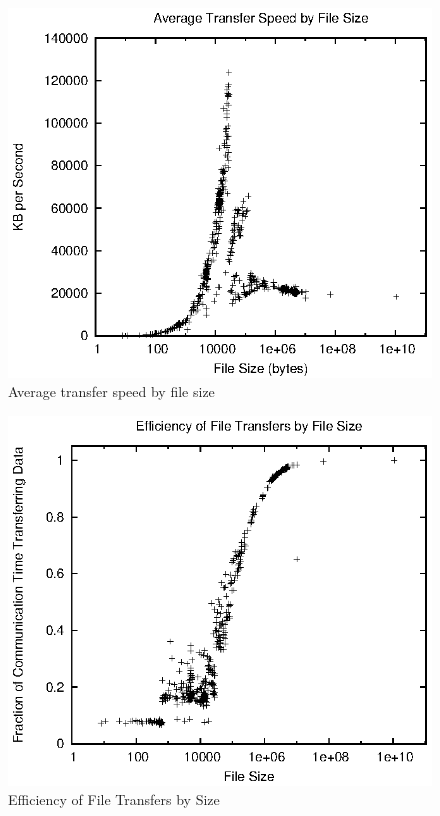 \begin{figure}[!ht]
\includegraphics[width=\linewidth]{fig6.eps}
\caption{Average transfer speed by file size}
\label{fig6}
\end{figure}

\begin{figure}[!ht]
\includegraphics[width=\linewidth]{fig7.eps}
\caption{Efficiency of File Transfers by Size}
\label{fig7}
\end{figure}

